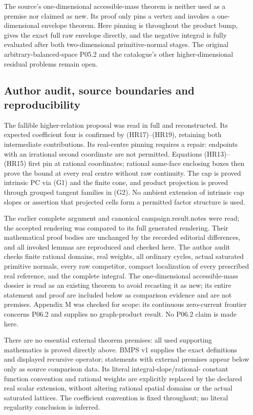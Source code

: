 \documentclass[
  11pt,
]{article}
\begin{document}
The source's one-dimensional accessible-mass theorem is neither used as
a premise nor claimed as new. Its proof only pins a vertex and invokes a
one-dimensional envelope theorem. Here pinning is throughout the product
bump, gives the exact full raw envelope directly, and the negative
integral is fully evaluated after both two-dimensional primitive-normal
stages. The original arbitrary-balanced-space P05.2 and the catalogue's
other higher-dimensional residual problems remain open.

\subsection{Author audit, source boundaries and
reproducibility}\label{author-audit-source-boundaries-and-reproducibility}

The fallible higher-relation proposal was read in full and
reconstructed. Its expected coefficient four is confirmed by
(HR17)--(HR19), retaining both intermediate contributions. Its
real-centre pinning requires a repair: endpoints with an irrational
second coordinate are not permitted. Equations (HR13)--(HR15) first pin
at rational coordinates; rational same-face enclosing boxes then prove
the bound at every real centre without raw continuity. The cap is proved
intrinsic PC via (G1) and the finite cone, and product projection is
proved through grouped tangent families in (G2). No ambient extension of
intrinsic cap slopes or assertion that projected cells form a permitted
factor structure is used.

The earlier complete argument and canonical campaign.result.notes were
read; the accepted rendering was compared to its full generated
rendering. Their mathematical proof bodies are unchanged by the recorded
editorial differences, and all invoked lemmas are reproduced and checked
here. The author audit checks finite rational domains, real weights, all
ordinary cycles, actual saturated primitive normals, every raw
competitor, compact localization of every prescribed real reference, and
the complete integral. The one-dimensional accessible-mass dossier is
read as an existing theorem to avoid recasting it as new; its entire
statement and proof are included below as comparison evidence and are
not premises. Appendix M was checked for scope: its continuous
zero-current frontier concerns P06.2 and supplies no graph-product
result. No P06.2 claim is made here.

There are no essential external theorem premises: all used supporting
mathematics is proved directly above. BMPS v1 supplies the exact
definitions and displayed recursive operator; statements with external
premises appear below only as source comparison data. Its literal
integral-slope/rational- constant function convention and rational
weights are explicitly replaced by the declared real scalar extension,
without altering rational spatial domains or the actual saturated
lattices. The coefficient convention is fixed throughout; no literal
regularity conclusion is inferred.
\end{document}
